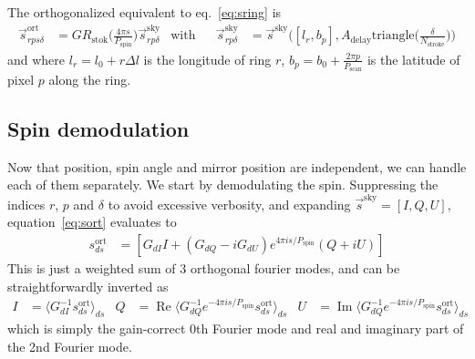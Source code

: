 \documentclass{article}
\renewcommand{\Re}{\operatorname{Re}}
\renewcommand{\Im}{\operatorname{Im}}
\begin{document}
The orthogonalized equivalent to eq.~\ref{eq:sring} is
\begin{align}
	\vec s^\textrm{ort}_{rps\delta} &= G R_\textrm{stok}
		\Big(\frac{4\pi s}{P_\textrm{spin}}\Big) \vec s^\textrm{sky}_{rp\delta} &
		\textrm{with} & &
	\vec s^\textrm{sky}_{rp\delta} &=
		\vec s^\textrm{sky}\Big([l_r,b_p],
		A_\textrm{delay}\textrm{triangle}\Big(\frac{\delta}{N_\textrm{stroke}}\Big)\Big)
	\label{eq:sort}
\end{align}
and where $l_r = l_0 + r\Delta l$ is the longitude of ring $r$,
$b_p = b_0 + \frac{2\pi p}{P_\textrm{scan}}$ is the latitude of pixel $p$
along the ring.

\subsection{Spin demodulation}
Now that position, spin angle and mirror position are independent, we can
handle each of them separately. We start by demodulating the spin.
Suppressing the indices $r$, $p$ and $\delta$ to avoid excessive
verbosity, and expanding $\vec s^\textrm{sky} = [I,Q,U]$, 
equation~\ref{eq:sort} evaluates to
\begin{align}
	s^\textrm{ort}_{ds} &= \left[G_{dI} I +
		(G_{dQ}-iG_{dU})e^{4\pi i s/P_\textrm{spin}} (Q + iU)\right]
\end{align}
This is just a weighted sum of 3 orthogonal fourier modes,
and can be straightforwardly inverted as
\begin{align}
	I &= \langle G_{dI}^{-1} s^\textrm{ort}_{ds}\rangle_{ds} &
	Q &= \Re \langle G_{dQ}^{-1}
			e^{-4\pi i s/P_\textrm{spin}} s^\textrm{ort}_{ds}\rangle_{ds} &
	U &= \Im \langle G_{dQ}^{-1}
			e^{-4\pi i s/P_\textrm{spin}} s^\textrm{ort}_{ds}\rangle_{ds}
\end{align}
which is simply the gain-correct 0th Fourier mode and
real and imaginary part of the 2nd Fourier mode.
\end{document}

